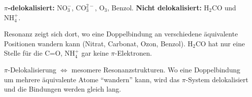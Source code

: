 \begin{ergebnis}
\textbf{$\pi$-delokalisiert:} $\mathrm{NO_3^-}$, $\mathrm{CO_3^{2-}}$,
$\mathrm{O_3}$, Benzol. \textbf{Nicht delokalisiert:}
$\mathrm{H_2CO}$ und $\mathrm{NH_4^+}$.
\end{ergebnis}

\begin{kontrolle}
Resonanz zeigt sich dort, wo eine Doppelbindung an verschiedene
\"aquivalente Positionen wandern kann (Nitrat, Carbonat, Ozon, Benzol).
$\mathrm{H_2CO}$ hat nur eine Stelle f\"ur die C=O, $\mathrm{NH_4^+}$ gar
keine $\pi$-Elektronen.
\end{kontrolle}

\begin{merksatz}
$\pi$-Delokalisierung $\Leftrightarrow$ mesomere Resonanzstrukturen. Wo
eine Doppelbindung um mehrere \"aquivalente Atome ``wandern'' kann, wird
das $\pi$-System delokalisiert und die Bindungen werden gleich lang.
\end{merksatz}
